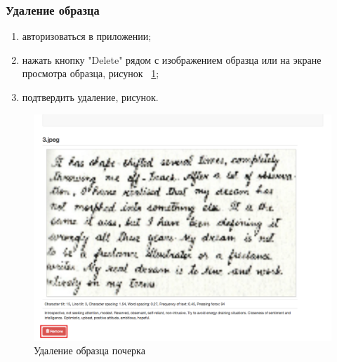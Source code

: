 \subsubsection{Удаление образца}
\label{sec:manpage:client_man:delete_sample}
\begin{enumerate}
    \item[1)] авторизоваться в приложении;
    \item[2)] нажать кнопку "Delete" рядом с изображением образца или на экране просмотра образца, рисунок ~\ref{fig:manpage:client_man:delete_sample};
    \item[3)] подтвердить удаление, рисунок.
\end{enumerate}

\begin{figure}[ht]
    \centering
    \includegraphics[width=0.3\textheight]{figures/delete_sample.png}
    \caption{Удаление образца почерка}
    \label{fig:manpage:client_man:delete_sample}
\end{figure}


